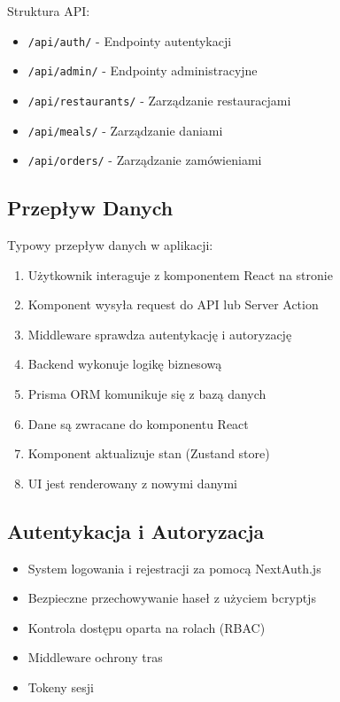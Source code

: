 \documentclass[12pt,a4paper,utf-8]{article}
\begin{document}
Struktura API:
\begin{itemize}
    \item \texttt{/api/auth/}  -  Endpointy autentykacji
    \item \texttt{/api/admin/}  -  Endpointy administracyjne
    \item \texttt{/api/restaurants/}  -  Zarządzanie restauracjami
    \item \texttt{/api/meals/}  -  Zarządzanie daniami
    \item \texttt{/api/orders/}  -  Zarządzanie zamówieniami
\end{itemize}

\subsection{Przepływ Danych}

Typowy przepływ danych w aplikacji:

\begin{enumerate}
    \item Użytkownik interaguje z komponentem React na stronie
    \item Komponent wysyła request do API lub Server Action
    \item Middleware sprawdza autentykację i autoryzację
    \item Backend wykonuje logikę biznesową
    \item Prisma ORM komunikuje się z bazą danych
    \item Dane są zwracane do komponentu React
    \item Komponent aktualizuje stan (Zustand store)
    \item UI jest renderowany z nowymi danymi
\end{enumerate}

\newpage

\subsection{Autentykacja i Autoryzacja}

\begin{itemize}
    \item [OK] System logowania i rejestracji za pomocą NextAuth.js
    \item [OK] Bezpieczne przechowywanie haseł z użyciem bcryptjs
    \item [OK] Kontrola dostępu oparta na rolach (RBAC)
    \item [OK] Middleware ochrony tras
    \item [OK] Tokeny sesji
\end{itemize}
\end{document}
